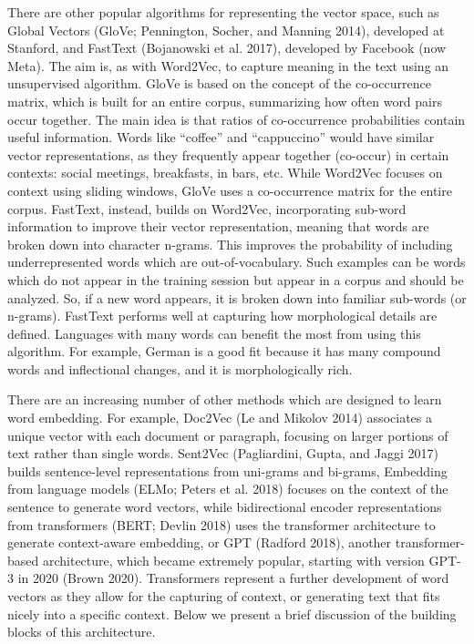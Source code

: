 There are other popular algorithms for representing the vector space, such
as Global Vectors (GloVe; Pennington, Socher, and Manning 2014),
developed at Stanford, and FastText (Bojanowski et al. 2017), developed
by Facebook (now Meta). The aim is, as with Word2Vec, to capture
meaning in the text using an unsupervised algorithm. GloVe is based
on the concept of the co-occurrence matrix, which is built for an entire
corpus, summarizing how often word pairs occur together. The main
idea is that ratios of co-occurrence probabilities contain useful
information. Words like ``coffee'' and ``cappuccino'' would have similar
vector representations, as they frequently appear together (co-occur) in
certain contexts: social meetings, breakfasts, in bars, etc. While
Word2Vec focuses on context using sliding windows, GloVe uses a
co-occurrence matrix for the entire corpus. FastText, instead, builds on Word2Vec, incorporating sub-word
information to improve their vector representation, meaning that words
are broken down into character n-grams. This improves the
probability of including underrepresented words which are
out-of-vocabulary. Such examples can be words which do not appear in the
training session but appear in a corpus and should be analyzed. So, if a new
word appears, it is broken down into familiar sub-words (or n-grams).
FastText performs well at capturing how morphological details are defined.
Languages with many words can benefit the most from using this algorithm. For
example, German is a good fit because it has many compound words and
inflectional changes, and it is morphologically rich.

There are an increasing number of other methods which are designed to
learn word embedding. For example, Doc2Vec (Le and Mikolov 2014)
associates a unique vector with each document or paragraph, focusing on
larger portions of text rather than single words. Sent2Vec (Pagliardini,
Gupta, and Jaggi 2017) builds sentence-level representations from
uni-grams and bi-grams, Embedding from language models (ELMo; Peters et
al. 2018) focuses on the context of the sentence to generate word vectors, while bidirectional encoder representations from transformers (BERT; Devlin
2018) uses the transformer architecture to generate context-aware
embedding, or GPT (Radford 2018), another transformer-based
architecture, which became extremely popular, starting with version GPT-3 in 2020 (Brown 2020). Transformers represent a further
development of word vectors as they allow for the capturing of context, or
generating text that fits nicely into a specific context. Below we
present a brief discussion of the building blocks of this architecture.

